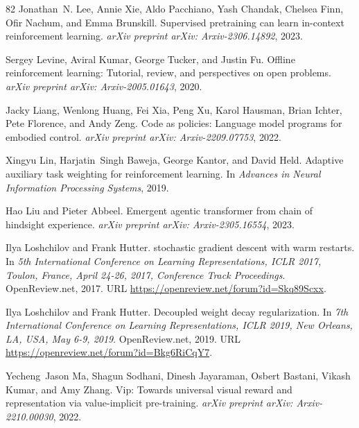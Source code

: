 \documentclass{article}
\begin{document}
\begin{thebibliography}{82}
Jonathan~N. Lee, Annie Xie, Aldo Pacchiano, Yash Chandak, Chelsea Finn, Ofir Nachum, and Emma Brunskill.
\newblock Supervised pretraining can learn in-context reinforcement learning.
\newblock \emph{arXiv preprint arXiv: Arxiv-2306.14892}, 2023.

Sergey Levine, Aviral Kumar, George Tucker, and Justin Fu.
\newblock Offline reinforcement learning: Tutorial, review, and perspectives on open problems.
\newblock \emph{arXiv preprint arXiv: Arxiv-2005.01643}, 2020.

Jacky Liang, Wenlong Huang, Fei Xia, Peng Xu, Karol Hausman, Brian Ichter, Pete Florence, and Andy Zeng.
\newblock Code as policies: Language model programs for embodied control.
\newblock \emph{arXiv preprint arXiv: Arxiv-2209.07753}, 2022.

Xingyu Lin, Harjatin~Singh Baweja, George Kantor, and David Held.
\newblock Adaptive auxiliary task weighting for reinforcement learning.
\newblock In \emph{Advances in Neural Information Processing Systems}, 2019.

Hao Liu and Pieter Abbeel.
\newblock Emergent agentic transformer from chain of hindsight experience.
\newblock \emph{arXiv preprint arXiv: Arxiv-2305.16554}, 2023.

Ilya Loshchilov and Frank Hutter.
 stochastic gradient descent with warm restarts.
\newblock In \emph{5th International Conference on Learning Representations, {ICLR} 2017, Toulon, France, April 24-26, 2017, Conference Track Proceedings}. OpenReview.net, 2017.
\newblock URL \url{https://openreview.net/forum?id=Skq89Scxx}.

Ilya Loshchilov and Frank Hutter.
\newblock Decoupled weight decay regularization.
\newblock In \emph{7th International Conference on Learning Representations, {ICLR} 2019, New Orleans, LA, USA, May 6-9, 2019}. OpenReview.net, 2019.
\newblock URL \url{https://openreview.net/forum?id=Bkg6RiCqY7}.

Yecheng~Jason Ma, Shagun Sodhani, Dinesh Jayaraman, Osbert Bastani, Vikash Kumar, and Amy Zhang.
\newblock Vip: Towards universal visual reward and representation via value-implicit pre-training.
\newblock \emph{arXiv preprint arXiv: Arxiv-2210.00030}, 2022.


\end{thebibliography}
\end{document}
